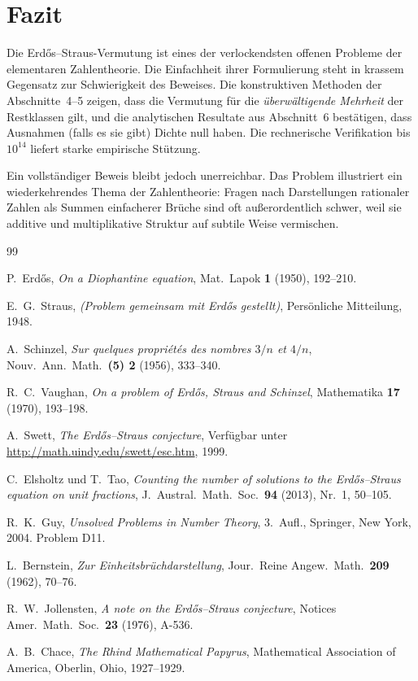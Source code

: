 \documentclass[12pt,a4paper]{amsart}
\theoremstyle{definition}
\begin{document}
\section*{Fazit}

Die Erd\H{o}s--Straus-Vermutung ist eines der verlockendsten offenen Probleme
der elementaren Zahlentheorie.  Die Einfachheit ihrer Formulierung steht in
krassem Gegensatz zur Schwierigkeit des Beweises.  Die konstruktiven Methoden
der Abschnitte~4--5 zeigen, dass die Vermutung für die \emph{überwältigende
Mehrheit} der Restklassen gilt, und die analytischen Resultate aus
Abschnitt~6 bestätigen, dass Ausnahmen (falls es sie gibt) Dichte null haben.
Die rechnerische Verifikation bis $10^{14}$ liefert starke empirische Stützung.

Ein vollständiger Beweis bleibt jedoch unerreichbar.  Das Problem illustriert
ein wiederkehrendes Thema der Zahlentheorie: Fragen nach Darstellungen
rationaler Zahlen als Summen einfacherer Brüche sind oft außerordentlich
schwer, weil sie additive und multiplikative Struktur auf subtile Weise
vermischen.

\begin{thebibliography}{99}

P.~Erd\H{o}s,
\emph{On a Diophantine equation},
Mat.\ Lapok \textbf{1} (1950), 192--210.

E.~G.~Straus,
\emph{(Problem gemeinsam mit Erd\H{o}s gestellt)},
Persönliche Mitteilung, 1948.

A.~Schinzel,
\emph{Sur quelques propri\'et\'es des nombres $3/n$ et $4/n$},
Nouv.\ Ann.\ Math.\ \textbf{(5) 2} (1956), 333--340.

R.~C.~Vaughan,
\emph{On a problem of Erd\H{o}s, Straus and Schinzel},
Mathematika \textbf{17} (1970), 193--198.

A.~Swett,
\emph{The Erd\H{o}s--Straus conjecture},
Verfügbar unter \url{http://math.uindy.edu/swett/esc.htm}, 1999.

C.~Elsholtz und T.~Tao,
\emph{Counting the number of solutions to the Erd\H{o}s--Straus equation on unit fractions},
J.~Austral.\ Math.\ Soc.\ \textbf{94} (2013), Nr.~1, 50--105.

R.~K.~Guy,
\emph{Unsolved Problems in Number Theory}, 3.~Aufl.,
Springer, New York, 2004.
Problem D11.

L.~Bernstein,
\emph{Zur Einheitsbr\"{u}chdarstellung}, Jour.\ Reine Angew.\ Math.\
\textbf{209} (1962), 70--76.

R.~W.~Jollensten,
\emph{A note on the Erd\H{o}s--Straus conjecture},
Notices Amer.\ Math.\ Soc.\ \textbf{23} (1976), A-536.

A.~B.~Chace,
\emph{The Rhind Mathematical Papyrus},
Mathematical Association of America, Oberlin, Ohio, 1927--1929.

\end{thebibliography}
\end{document}
